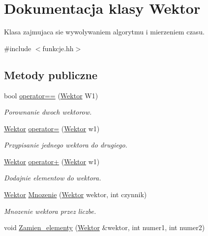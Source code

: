 \hypertarget{class_wektor}{\section{\-Dokumentacja klasy \-Wektor}
\label{class_wektor}
}


\-Klasa zajmujaca sie wywolywaniem algorytmu i mierzeniem czasu.  




{\ttfamily \#include $<$funkcje.\-hh$>$}

\subsection*{\-Metody publiczne}
\begin{DoxyCompactItemize}
\item 
bool \hyperlink{class_wektor_ad365675e9fe0efb615f10de33b0f0009}{operator==} (\hyperlink{class_wektor}{\-Wektor} \-W1)
\begin{DoxyCompactList}\small\item\em \-Porownanie dwoch wektorow. \end{DoxyCompactList}\item 
\hyperlink{class_wektor}{\-Wektor} \hyperlink{class_wektor_a1894204ffc646673e0f4fb640652a902}{operator=} (\hyperlink{class_wektor}{\-Wektor} w1)
\begin{DoxyCompactList}\small\item\em \-Przypisanie jednego wektora do drugiego. \end{DoxyCompactList}\item 
\hyperlink{class_wektor}{\-Wektor} \hyperlink{class_wektor_a3a25fe8e4a3b3d6bbb8c010034e630de}{operator+} (\hyperlink{class_wektor}{\-Wektor} w1)
\begin{DoxyCompactList}\small\item\em \-Dodajnie elementow do wektora. \end{DoxyCompactList}\item 
\hyperlink{class_wektor}{\-Wektor} \hyperlink{class_wektor_afdaf18c7476c6521326cefcac4c91b49}{\-Mnozenie} (\hyperlink{class_wektor}{\-Wektor} wektor, int czynnik)
\begin{DoxyCompactList}\small\item\em \-Mnozenie wektora przez liczbe. \end{DoxyCompactList}\item 
void \hyperlink{class_wektor_a46dc763191a79b5d9a4d390515f97696}{\-Zamien\-\_\-elementy} (\hyperlink{class_wektor}{\-Wektor} \&wektor, int numer1, int numer2)

\end{DoxyCompactItemize}
